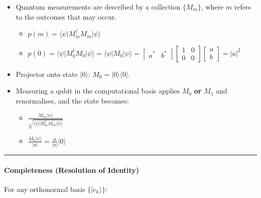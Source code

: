 \begin{itemize}
\tightlist
\item
  Quantum measurements are described by a collection
  \(\lbrace M_m \rbrace\), where \(m\) refers to the outcomes that may
  occur.

  \begin{itemize}
  \tightlist
  \item
    \(p(m) = \langle \psi \lvert M_m^{\dagger} M_m \lvert \psi \rangle\)
  \item
    \(p(0) = \langle \psi \lvert M_0^{\dagger} M_0 \lvert \psi \rangle = \langle \psi \lvert M_0 \lvert \psi \rangle = \begin{bmatrix}a^*&b^*\end{bmatrix} \begin{bmatrix}1&0\\0&0\end{bmatrix} \begin{bmatrix}a\\b\end{bmatrix} = \lvert a \lvert ^2\)
  \end{itemize}
\item
  Projector onto state \(\lvert0\rangle\):
  \(M_0=\lvert0\rangle\langle0\rvert\).\\
\item
  Measuring a qubit in the computational basis applies \(M_0\)
  \textbf{or} \(M_1\) and renormalises, and the state becomes:

  \begin{itemize}
  \tightlist
  \item
     \(\frac{M_m \lvert \psi \rangle}{\sqrt{\langle\psi \lvert M_m^{\dagger} M_m \lvert \psi \rangle }}
     \)
  \item
    \(\frac{M_0 \lvert \psi \rangle}{\lvert a \lvert} = \frac{a}{\lvert a \lvert} \lvert0 \rangle\)
  \end{itemize}
\end{itemize}

\begin{center}\rule{0.5\linewidth}{0.5pt}\end{center}

\hypertarget{completeness-resolution-of-identity}{%
\paragraph{Completeness (Resolution of
Identity)}\label{completeness-resolution-of-identity}}

For any orthonormal basis \(\{\lvert e_k\rangle\}\):

